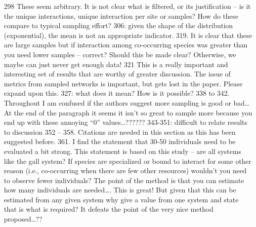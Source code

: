298 These seem arbitrary. It is not clear what is filtered, or its justification – is it the unique interactions, unique interaction per site or samples? How do these compare to typical sampling effort?
306: given the shape of the distribution (exponential), the mean is not an appropriate indicator.
319.  It is clear that these are large samples but if interaction among co-occurring species was greater than you need lower samples – correct?  Should this be made clear?  Otherwise, we maybe can just never get enough data!
321 This is a really important and interesting set of results that are worthy of greater discussion. The issue of metrics from sampled networks is important, but gets lost in the paper. Please expand upon this.
327: what does it mean? How is it possible?
338 to 342.  Throughout I am confused if the authors suggest more sampling is good or bad…  At the end of the paragraph it seems it isn’t so great to sample more because you end up with these annoying “0” values…??????
343-351: difficult to relate results to discussion
352 – 358.  Citations are needed in this section as this has been suggested before.
361.  I find the statement that 30-50 individuals need to be evaluated a bit strong.  This statement is based on this study – are all systems like the gall system?  If species are specialized or bound to interact for some other reason (i.e., co-occurring when there are few other resources) wouldn’t you need to observe fewer individuals?  The point of the method is that you can estimate how many individuals are needed…. This is great!  But given that this can be estimated from any given system why give a value from one system and state that is what is required?  It defeats the point of the very nice method proposed…??